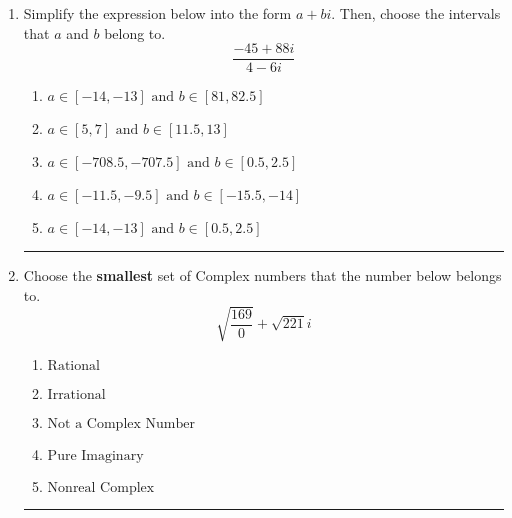 \documentclass[14pt]{extbook}
\newcommand{\litem}[1]{\item#1\hspace*{-1cm}\rule{\textwidth}{0.4pt}}
\begin{document}
\begin{enumerate}
{\begin{enumerate}[label=\Alph*.]
\end{enumerate} }
\litem{
Simplify the expression below into the form $a+bi$. Then, choose the intervals that $a$ and $b$ belong to.\[ \frac{-45 + 88 i}{4 - 6 i} \]\begin{enumerate}[label=\Alph*.]
\item \( a \in [-14, -13] \text{ and } b \in [81, 82.5] \)
\item \( a \in [5, 7] \text{ and } b \in [11.5, 13] \)
\item \( a \in [-708.5, -707.5] \text{ and } b \in [0.5, 2.5] \)
\item \( a \in [-11.5, -9.5] \text{ and } b \in [-15.5, -14] \)
\item \( a \in [-14, -13] \text{ and } b \in [0.5, 2.5] \)

\end{enumerate} }
\litem{
Choose the \textbf{smallest} set of Complex numbers that the number below belongs to.\[ \sqrt{\frac{169}{0}}+\sqrt{221} i \]\begin{enumerate}[label=\Alph*.]
\item \( \text{Rational} \)
\item \( \text{Irrational} \)
\item \( \text{Not a Complex Number} \)
\item \( \text{Pure Imaginary} \)
\item \( \text{Nonreal Complex} \)

\end{enumerate} }
\end{enumerate}
\end{document}
